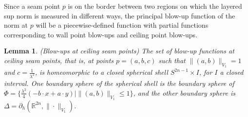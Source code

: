 \documentclass{article}
\newtheorem{lemma}[theorem]{Lemma}
\theoremstyle{definition}
\newcommand{\norm}[1]{\|#1\|}
\newcommand{\bhor}{\partial_h}
\newcommand{\R}{{\mathbb R}}
\begin{document}
Since a seam point $p$ is on the border between two regions on which the layered sup norm is measured in different ways, the principal blow-up function of the norm at $p$ will be a piecewise-defined function with partial functions corresponding to wall point blow-ups and ceiling point blow-ups.


\begin{lemma}{(Blow-ups at ceiling seam points)}
The set of blow-up functions at ceiling seam points, that is, at points $p = (a,b,c)$ such that $\norm{(a,b)}_{V_1} = 1$ and $c = \frac1{\lambda^2}$, is homeomorphic to a closed spherical shell $S^{2n-1}\times I$, for $I$ a closed interval. One boundary sphere of the spherical shell is the boundary sphere of $\Phi=\{\frac{\lambda^2}4(-b\cdot x + a\cdot y)\mid \norm{(a,b)}_{V_1} \leq 1\}$, and the other boundary sphere is $\Delta = \bhor(\R^{2n},\norm{\cdot}_{V_1})$.
\end{lemma}
\end{document}

